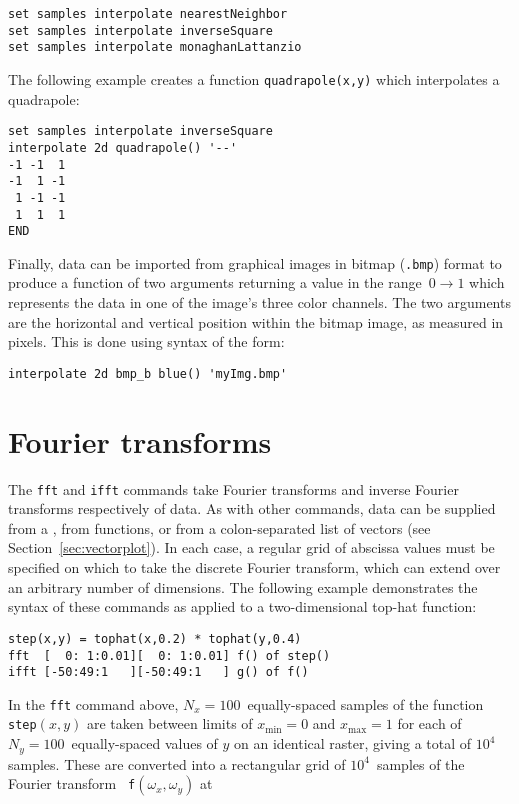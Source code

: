 \begin{verbatim}
set samples interpolate nearestNeighbor
set samples interpolate inverseSquare
set samples interpolate monaghanLattanzio
\end{verbatim}

The following example creates a function {\tt quad\-ra\-pole(x,y)} which interpolates a quadrapole:

\begin{verbatim}
set samples interpolate inverseSquare
interpolate 2d quadrapole() '--'
-1 -1  1
-1  1 -1
 1 -1 -1
 1  1  1
END
\end{verbatim}

Finally, data can be imported from graphical images in bitmap ({\tt .bmp})
format to produce a function of two arguments returning a value in the
range~$0\to1$ which represents the data in one of the image's three color
channels. The two arguments are the horizontal and vertical position within the
bitmap image, as measured in pixels. This is done using syntax of the form:

\begin{verbatim}
interpolate 2d bmp_b blue() 'myImg.bmp'
\end{verbatim}

\section{Fourier transforms}

The {\tt fft} and {\tt ifft} commands take Fourier
transforms and inverse Fourier transforms respectively of data. As with other
commands, data can be supplied from a \datafile, from functions, or from a
colon-separated list of vectors (see Section~\ref{sec:vectorplot}). In each
case, a regular grid of abscissa values must be specified on which to take the
discrete Fourier transform, which can extend over an arbitrary number of
dimensions. The following example demonstrates the syntax of these commands as
applied to a two-dimensional top-hat function:

\begin{verbatim}
step(x,y) = tophat(x,0.2) * tophat(y,0.4)
fft  [  0: 1:0.01][  0: 1:0.01] f() of step()
ifft [-50:49:1   ][-50:49:1   ] g() of f()
\end{verbatim}

\noindent In the {\tt fft} command above, $N_x=100$~equally-spaced samples of
the function {\tt step}$(x,y)$ are taken between limits of $x_\mathrm{min}=0$
and $x_\mathrm{max}=1$ for each of $N_y=100$~equally-spaced values of $y$ on an
identical raster, giving a total of $10^4$ samples. These are converted into a
rectangular grid of $10^4$~samples of the Fourier transform {\tt
f}$(\omega_x,\omega_y)$ at

